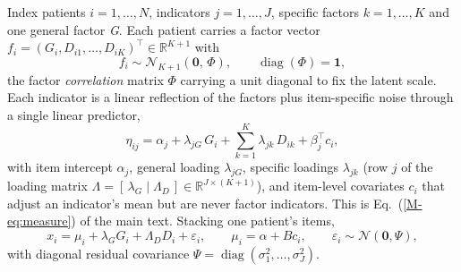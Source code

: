 \documentclass[11pt]{article}
\newcommand{\Gfac}{\textit{G}}
\theoremstyle{plain}
\theoremstyle{definition}
\newcommand{\MEq}[1]{Eq.~(\ref{M-#1})}
\begin{document}
Index patients $i=1,\dots,N$, indicators $j=1,\dots,J$, specific factors
$k=1,\dots,K$ and one general factor \Gfac. Each patient carries a factor vector
$f_i=(G_i,D_{i1},\dots,D_{iK})^{\top}\in\mathbb{R}^{K+1}$ with
\begin{equation}
  f_i \sim \mathcal{N}_{K+1}\!\left(\mathbf{0},\,\Phi\right),
  \qquad \operatorname{diag}(\Phi)=\mathbf{1},
  \label{eq:factors}
\end{equation}
the factor \emph{correlation} matrix $\Phi$ carrying a unit diagonal to fix the latent
scale. Each indicator is a linear reflection of the factors plus item-specific noise
through a single linear predictor,
\begin{equation}
  \eta_{ij} = \alpha_j + \lambda_{jG}\,G_i + \sum_{k=1}^{K}\lambda_{jk}\,D_{ik}
  + \beta_j^{\top} c_i ,
  \label{eq:linpred}
\end{equation}
with item intercept $\alpha_j$, general loading $\lambda_{jG}$, specific loadings
$\lambda_{jk}$ (row $j$ of the loading matrix
$\Lambda=[\,\lambda_G\mid\Lambda_D\,]\in\mathbb{R}^{J\times(K+1)}$), and item-level
covariates $c_i$ that adjust an indicator's mean but are never factor indicators. This
is \MEq{eq:measure} of the main text. Stacking one patient's items,
\begin{equation}
  x_i=\mu_i+\lambda_G G_i+\Lambda_D D_i+\varepsilon_i,
  \qquad \mu_i=\alpha+B c_i,\qquad \varepsilon_i\sim\mathcal{N}(\mathbf 0,\Psi),
  \label{eq:xstack}
\end{equation}
with diagonal residual covariance $\Psi=\operatorname{diag}(\sigma_1^2,\dots,\sigma_J^2)$.
\end{document}
